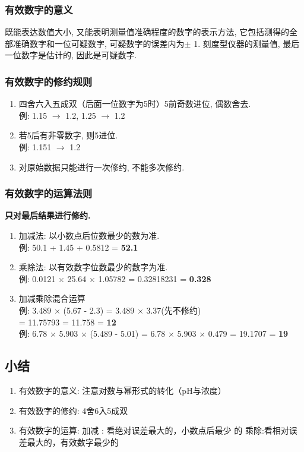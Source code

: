 \documentclass[12pt, a4paper, oneside]{ctexbook}
\begin{document}
\subsubsection{有效数字的意义}
既能表达数值大小, 又能表明测量值准确程度的数字的表示方法, 
它包括测得的全部准确数字和一位可疑数字, 可疑数字的误差内为$\pm$ 1. 刻度型仪器的测量值, 最后一位数字是估计的, 因此是可疑数字. 
\subsubsection{有效数字的修约规则}
\begin{enumerate}
    \item 四舍六入五成双（后面一位数字为5时）5前奇数进位, 偶数舍去. \\例: 1.15 $\to$ 1.2, 1.25 $\to$ 1.2
    \item 若5后有非零数字, 则5进位. \\例: 1.151 $\to$ 1.2
    \item 对原始数据只能进行一次修约, 不能多次修约.
\end{enumerate}

\subsubsection{有效数字的运算法则}
\textbf{只对最后结果进行修约. }
\begin{enumerate}
    \item 加减法: 以小数点后位数最少的数为准. \\例: 50.1 + 1.45 + 0.5812 = \textbf{52.1}
    \item 乘除法: 以有效数字位数最少的数字为准. \\例: 0.0121 $\times$ 25.64 $\times$ 1.05782 = 0.32818231 = \textbf{0.328}
    \item 加减乘除混合运算\\例: 3.489 $\times$ (5.67 - 2.3) = 3.489 $\times$ 3.37(先不修约) \\= 11.75793 = 11.758 = \textbf{12}
    \\例: 6.78 $\times$ 5.903 $\times$ (5.489 - 5.01) = 6.78 $\times$ 5.903 $\times$ 0.479 = 19.1707 = \textbf{19}\\
\end{enumerate}

\subsection*{小结}
\begin{enumerate}
    \item 有效数字的意义: 注意对数与幂形式的转化（pH与浓度）
    \item 有效数字的修约: 4舍6入5成双
    \item 有效数字的运算: 加减 : 看绝对误差最大的，小数点后最少 的
    乘除:看相对误差最大的，有效数字最少的
    
\end{enumerate}
\end{document}
